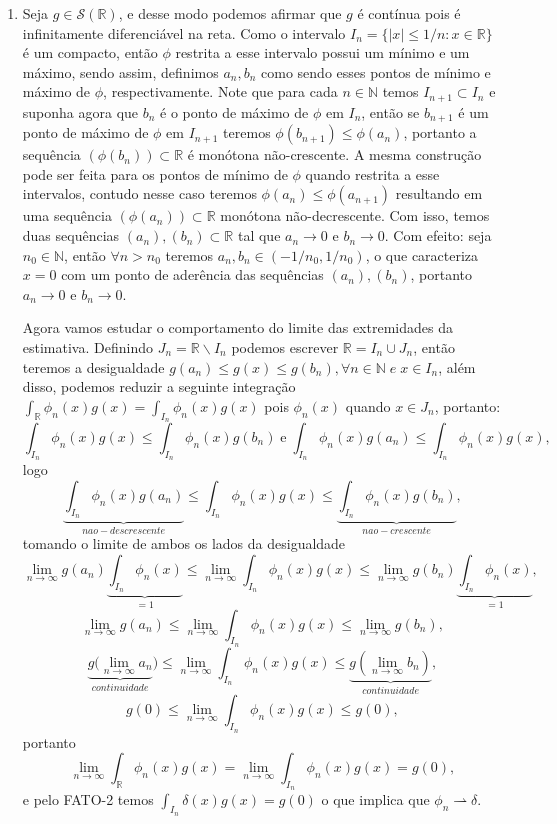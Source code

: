 \documentclass{article}
\begin{document}
\begin{enumerate}
\begin{enumerate}
					
				\item Seja $g \in \mathcal{S}(\mathbb{R})$, e desse modo 
				podemos afirmar que $g$ é contínua pois é infinitamente diferenciável na reta. Como o intervalo $I_{n} = \{|x| \leq 1/n: x \in \mathbb{R} \}$ é um compacto, então $\phi$ restrita a esse intervalo possui um mínimo e um máximo, sendo assim, definimos $a_{n}, b_{n}$ como sendo esses pontos de mínimo e máximo de $\phi$, respectivamente. Note que para cada $n \in \mathbb{N}$ temos $I_{n+1} \subset I_{n}$ e suponha agora que $b_{n}$ é o ponto de máximo de $\phi$ em $I_{n}$, então se $b_{n+1}$ é um ponto de máximo de $\phi$ em $I_{n+1}$ teremos $\phi(b_{n+1}) \leq \phi(a_{n})$, portanto a sequência $(\phi(b_{n})) \subset \mathbb{R}$ é monótona não-crescente. A mesma construção pode ser feita para os pontos de mínimo de $\phi$ quando restrita a esse intervalos, contudo nesse caso teremos $\phi(a_{n}) \leq \phi(a_{n+1})$ resultando em uma sequência $(\phi(a_{n})) \subset \mathbb{R}$ monótona não-decrescente. Com isso, temos duas sequências $(a_{n}), (b_{n}) \subset \mathbb{R}$ tal que $a_{n} \to 0$ e $b_{n} \to 0$. Com efeito: seja $n_{0} \in \mathbb{N}$, então $\forall n > n_0$ teremos $a_{n}, b_{n}  \in (-1/n_{0}, 1/n_{0})$, o que caracteriza $x=0$ com um ponto de aderência das sequências $(a_{n}), (b_{n})$, portanto $a_{n} \to 0$ e $b_{n} \to 0$.
				
				Agora vamos estudar o comportamento do limite das extremidades da estimativa. Definindo $J_{n} = \mathbb{R}\backslash I_{n}$ podemos escrever $\mathbb{R} = I_{n} \cup J_{n}$, então teremos a desigualdade $g(a_{n}) \leq g(x) \leq g(b_{n}), \forall n \in \mathbb{N} \; e \; x \in I_{n}$, além disso, podemos reduzir a seguinte integração $\int_{\mathbb{R}} \phi_{n}(x)g(x) = \int_{I_{n}} \phi_{n}(x)g(x)$ pois $\phi_{n}(x)$ quando $x \in J_{n}$, portanto:
				$$
				\int_{I_{n}} \phi_{n}(x) g(x) \leq \int_{I_{n}} \phi_{n}(x) g(b_{n}) \; \text{e} \;
				\int_{I_{n}} \phi_{n}(x) g(a_{n}) \leq \int_{I_{n}} \phi_{n}(x)g(x),
				$$
				logo
				$$
				\underbrace{ \int_{I_{n}} \phi_{n}(x) g(a_{n}) }_{nao-descrescente} 
				\leq \int_{I_{n}} \phi_{n}(x)g(x) \leq \underbrace{\int_{I_{n}} \phi_{n}(x) g(b_{n})}_{nao-crescente},
				$$
				tomando o limite de ambos os lados da desigualdade
				$$
				\lim_{n\to \infty} g(a_{n}) \underbrace{ \int_{I_{n}} \phi_{n}(x) }_{=1}\leq \lim_{n\to \infty} \int_{I_{n}}\phi_{n}(x)g(x) \leq  \lim_{n\to \infty}  g(b_{n}) \underbrace{ \int_{I_{n}} \phi_{n}(x) }_{=1},
				$$
				$$
				\lim_{n\to \infty} g(a_{n}) \leq \lim_{n\to \infty} \int_{I_{n}}\phi_{n}(x)g(x) \leq  \lim_{n\to \infty}  g(b_{n}) ,
				$$
				$$
				\underbrace{ g(\lim_{n\to \infty} a_{n}}_{continuidade}) \leq \lim_{n\to \infty} \int_{I_{n}}\phi_{n}(x)g(x) \leq \underbrace{ g(\lim_{n\to \infty} b_{n}) }_{continuidade} ,
				$$
				$$
				g(0) \leq \lim_{n\to \infty} \int_{I_{n}}\phi_{n}(x)g(x) \leq  g(0) ,
				$$
				portanto
				$$
				 \lim_{n\to \infty} \int_{\mathbb{R}} \phi_{n}(x)g(x) = \lim_{n\to \infty} \int_{I_{n}}\phi_{n}(x)g(x) = g(0),
				$$
				e pelo FATO-2 temos $\int_{I_{n}}\delta(x)g(x) = g(0)$ o que implica que $\phi_{n} \rightharpoonup \delta$.
				

\end{enumerate}
\end{enumerate}
\end{document}
